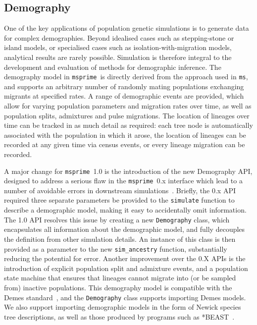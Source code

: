 \documentclass{article}
\newcommand{\msprime}[0]{\texttt{msprime}}
\newcommand{\ms}[0]{\texttt{ms}}
\begin{document}
\subsection*{Demography}
One of the key applications of population genetic simulations is to generate
data for complex demographies. Beyond idealised cases such as stepping-stone or
island models, or specialised cases such as isolation-with-migration models,
analytical results are rarely possible. Simulation is therefore integral to the
development and evaluation of methods for demographic inference. The demography
model in \msprime\ is directly derived from the approach used in \ms, and
supports an arbitrary number of randomly mating populations exchanging migrants
at specified rates. A range of demographic events are provided, which allow for
varying population parameters and migration rates over time, as well as
population splits, admixtures and pulse migrations. The location of lineages
over time can be tracked in as much detail as required: each tree node is
automatically associated with the population in which it arose, the location of
lineages can be recorded at any given time via census events, or every lineage
migration can be recorded.

A major change for \msprime\ 1.0 is the introduction of the new Demography API,
designed to address a serious flaw in the \msprime\ 0.x interface which lead to
a number of avoidable errors in downstream
simulations~\citep{ragsdale2020lessons}. Briefly, the 0.x API required three
separate parameters be provided to the \texttt{simulate} function to describe a
demographic model, making it easy to accidentally omit information. The 1.0 API
resolves this issue by creating a new \texttt{Demography} class, which
encapsulates all information about the demographic model, and fully decouples
the definition from other simulation details. An instance of this class is then
provided as a parameter to the new \texttt{sim\_ancestry} function,
substantially reducing the potential for error. Another improvement over the
0.X APIs is the introduction of explicit population split and admixture events,
and a population state machine that ensures that lineages cannot migrate into
(or be sampled from) inactive populations. This demography model is compatible
with the Demes standard~\citep{gower2021demes}, and the \texttt{Demography}
class supports importing Demes models. We also support importing demographic
models in the form of Newick species tree descriptions, as well as those
produced by programs such as *BEAST~\citep{heled2009bayesian}.
\end{document}
